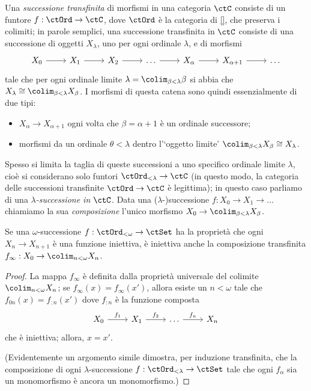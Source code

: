 \begin{definition}
	Una \emph{successione transfinita} di morfismi in una categoria \(\ctC\) consiste di un funtore \(f : \ctOrd \to \ctC\), dove \(\ctOrd\) è la categoria di \ref{}, che preserva i colimiti; in parole semplici, una successione transfinita in \(\ctC\) consiste di una successione di oggetti \(X_\lambda\), uno per ogni ordinale \(\lambda\), e di morfismi
	\[
		\begin{tikzcd}
			X_0 \ar[r] & X_1\ar[r] & X_2 \ar[r]& \dots \ar[r] & X_\alpha \ar[r] & X_{\alpha+1}\ar[r] & \dots
		\end{tikzcd}
	\]
	tale che per ogni ordinale limite \(\lambda = \colim_{\beta<\lambda}\beta\) si abbia che \(X_\lambda\cong \colim_{\beta < \lambda} X_\beta\). I morfismi di questa catena sono quindi essenzialmente di due tipi:
	\begin{itemize}
		\item \(X_\alpha \to X_{\alpha+1}\) ogni volta che \(\beta=\alpha+1\) è un ordinale successore;
		\item morfismi da un ordinale \(\theta<\lambda\) dentro l'`oggetto limite' \(\colim_{\beta<\lambda}X_\beta\cong X_\lambda\).
	\end{itemize}
	Spesso si limita la taglia di queste successioni a uno specifico ordinale limite \(\lambda\), cioè si considerano solo funtori \(\ctOrd_{<\lambda}\to\ctC\) (in questo modo, la categoria delle successioni transfinite \(\ctOrd \to \ctC\) è legittima); in questo caso parliamo di una \emph{\(\lambda\)-successione in \(\ctC\)}. Data una (\(\lambda\)-)successione \(f : X_0\to X_1 \to \dots\) chiamiamo la sua \emph{composizione} l'unico morfismo \(X_0\to \colim_{\beta<\lambda} X_\beta\).
\end{definition}
\begin{proposition}
	Se una \(\omega\)-successione \(f : \ctOrd_{<\omega}\to\ctSet\) ha la proprietà che ogni \(X_n \to X_{n+1}\) è una funzione iniettiva, è iniettiva anche la composizione transfinita \(f_\infty : X_0\to \colim_{n<\omega} X_n\).
\end{proposition}
\begin{proof}
	La mappa \(f_\infty\) è definita dalla proprietà universale del colimite \(\colim_{n<\omega} X_n\); se \(f_\infty(x)=f_\infty(x')\), allora esiste un \(n<\omega\) tale che \(f_{0n}(x) = f_{:n}(x')\) dove \(f_{:n}\) è la funzione composta
	\[\begin{tikzcd}
			X_0 \ar[r, "f_1"]& X_1\ar[r, "f_2"] & \dots \ar[r, "f_n"] & X_n
		\end{tikzcd}\]
	che è iniettiva; allora, \(x=x'\).

	(Evidentemente un argomento simile dimostra, per induzione transfinita, che la composizione di ogni \(\lambda\)-successione \(f : \ctOrd_{<\lambda}\to\ctSet\) tale che ogni \(f_\alpha\) sia un monomorfismo è ancora un monomorfismo.)
\end{proof}
